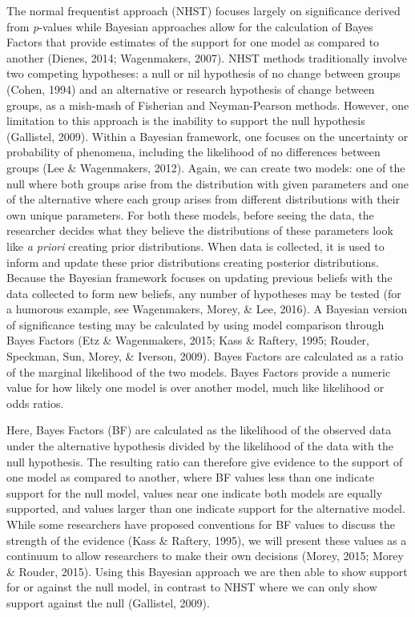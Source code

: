 \documentclass[english,man, mask]{apa6}
\theoremstyle{definition}
\theoremstyle{definition}
\theoremstyle{definition}
\theoremstyle{remark}
\begin{document}
The normal frequentist approach (NHST) focuses largely on significance
derived from \emph{p}-values while Bayesian approaches allow for the
calculation of Bayes Factors that provide estimates of the support for
one model as compared to another (Dienes, 2014; Wagenmakers, 2007). NHST
methods traditionally involve two competing hypotheses: a null or nil
hypothesis of no change between groups (Cohen, 1994) and an alternative
or research hypothesis of change between groups, as a mish-mash of
Fisherian and Neyman-Pearson methods. However, one limitation to this
approach is the inability to support the null hypothesis (Gallistel,
2009). Within a Bayesian framework, one focuses on the uncertainty or
probability of phenomena, including the likelihood of no differences
between groups (Lee \& Wagenmakers, 2012). Again, we can create two
models: one of the null where both groups arise from the distribution
with given parameters and one of the alternative where each group arises
from different distributions with their own unique parameters. For both
these models, before seeing the data, the researcher decides what they
believe the distributions of these parameters look like \emph{a priori}
creating prior distributions. When data is collected, it is used to
inform and update these prior distributions creating posterior
distributions. Because the Bayesian framework focuses on updating
previous beliefs with the data collected to form new beliefs, any number
of hypotheses may be tested (for a humorous example, see Wagenmakers,
Morey, \& Lee, 2016). A Bayesian version of significance testing may be
calculated by using model comparison through Bayes Factors (Etz \&
Wagenmakers, 2015; Kass \& Raftery, 1995; Rouder, Speckman, Sun, Morey,
\& Iverson, 2009). Bayes Factors are calculated as a ratio of the
marginal likelihood of the two models. Bayes Factors provide a numeric
value for how likely one model is over another model, much like
likelihood or odds ratios.

Here, Bayes Factors (BF) are calculated as the likelihood of the
observed data under the alternative hypothesis divided by the likelihood
of the data with the null hypothesis. The resulting ratio can therefore
give evidence to the support of one model as compared to another, where
BF values less than one indicate support for the null model, values near
one indicate both models are equally supported, and values larger than
one indicate support for the alternative model. While some researchers
have proposed conventions for BF values to discuss the strength of the
evidence (Kass \& Raftery, 1995), we will present these values as a
continuum to allow researchers to make their own decisions (Morey, 2015;
Morey \& Rouder, 2015). Using this Bayesian approach we are then able to
show support for or against the null model, in contrast to NHST where we
can only show support against the null (Gallistel, 2009).
\end{document}
